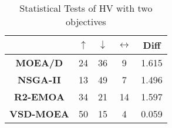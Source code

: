 
\begin{table}[t]
\centering
\caption{Statistical Tests of HV with two objectives}
\label{tab:Tests_HV_2obj}

\begin{tabular}{c|c|c|c|c|}
\cline{2-5}
                                        & \textbf{$\uparrow$} & \textbf{$\downarrow$} & \textbf{$\leftrightarrow$} & \textbf{Diff} \\ \hline
\multicolumn{1}{|c|}{\textbf{MOEA/D}}   & 24                  & 36                    & 9                          & 1.615         \\ \hline
\multicolumn{1}{|c|}{\textbf{NSGA-II}}  & 13                  & 49                    & 7                          & 1.496         \\ \hline
\multicolumn{1}{|c|}{\textbf{R2-EMOA}}  & 34                  & 21                    & 14                         & 1.597         \\ \hline
\multicolumn{1}{|c|}{\textbf{VSD-MOEA}} & 50                  & 15                    & 4                          & 0.059         \\ \hline
\end{tabular}%
\end{table}


%


